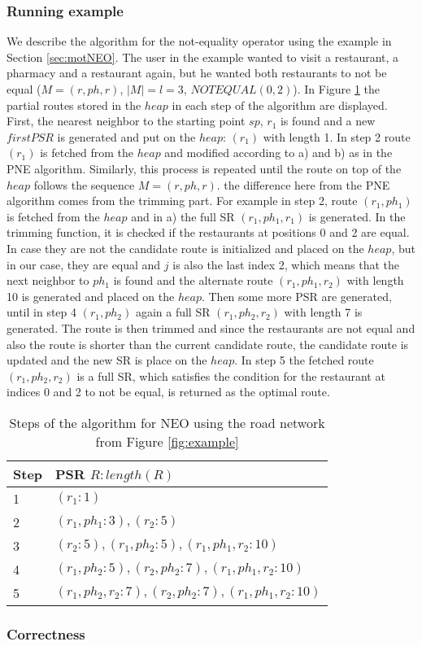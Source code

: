 \subsubsection{Running example}
We describe the algorithm for the not-equality operator using the example in Section \ref{sec:motNEO}. The user in the example wanted to visit a restaurant, a pharmacy and a restaurant again, but he wanted both restaurants to not be equal ($M = (r, ph, r)$, $|M| = l = 3$, $NOTEQUAL(0, 2)$). In Figure \ref{heapNEO} the partial routes stored in the $heap$ in each step of the algorithm are displayed.
First, the nearest neighbor to the starting point $sp$, $r_1$  is found and a new $firstPSR$ is generated and put on the $heap$: $(r_1)$ with length 1. In step 2 route $(r_1)$ is fetched from the $heap$ and modified according to a) and b) as in the PNE algorithm. Similarly, this process is repeated until the route on top of the $heap$ follows the sequence $M = (r, ph, r)$. the difference here from the PNE algorithm comes from the trimming part. For example in step 2, route $(r_1, ph_1)$ is fetched from the $heap$ and in a) the full SR $(r_1, ph_1, r_1)$ is generated. In the trimming function, it is checked if the restaurants at positions 0 and 2 are equal. In case they are not the candidate route is initialized and placed on the $heap$, but in our case, they are equal and $j$ is also the last index 2, which means that the next neighbor to $ph_1$ is found and the alternate route $(r_1, ph_1, r_2)$ with length 10 is generated and placed on the $heap$. Then some more PSR are generated, until in step 4 $(r_1, ph_2)$ again a full SR $(r_1, ph_2, r_2)$ with length 7 is generated. The route is then trimmed and since the restaurants are not equal and also the route is shorter than the current candidate route, the candidate route is updated and the new SR is place on the $heap$. In step 5 the fetched route $(r_1, ph_2, r_2)$ is a full SR, which satisfies the condition for the restaurant at indices 0 and 2 to not be equal, is returned as the optimal route.

\begin{table}[h]
	\centering
	\begin{tabular}{ |l|l| } 
		\hline
		Step & PSR $R : length(R)$ \\
		\hline
		1 & $(r_1 : 1)$ \\ 
		 \hline
		2 & $(r_1, ph_1 : 3), (r_2 : 5)$ \\ 
		\hline
		3 & $(r_2 : 5), (r_1, ph_2 : 5), (r_1, ph_1, r_2 : 10)$ \\ 
		\hline
		4 & $(r_1, ph_2 : 5), (r_2, ph_2 : 7), (r_1, ph_1, r_2 : 10)$ \\ 
		\hline
		5 & $(r_1, ph_2, r_2 : 7), (r_2, ph_2 : 7), (r_1, ph_1, r_2 : 10)$ \\ 
		\hline
	\end{tabular}
	\caption{Steps of the algorithm for NEO using the road network from Figure \ref{fig:example}}
	\label{heapNEO}
\end{table}

\subsubsection{Correctness}
\label{sec:correctnessNEO}
